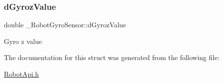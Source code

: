 \subsubsection{\texorpdfstring{d\+Gyroz\+Value}{dGyrozValue}}
{\footnotesize\ttfamily double \+\_\+\+Robot\+Gyro\+Sensor\+::d\+Gyroz\+Value}

Gyro z value 

The documentation for this struct was generated from the following file\+:\begin{DoxyCompactItemize}
\item 
\hyperlink{RobotApi_8h}{Robot\+Api.\+h}\end{DoxyCompactItemize}
